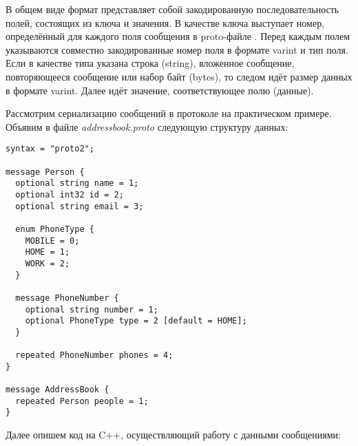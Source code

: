 В общем виде формат представляет собой закодированную последовательность полей, состоящих из ключа и значения. В качестве ключа выступает номер, определённый для каждого поля сообщения в proto-файле \cite{proto_encoding}. Перед каждым полем указываются совместно закодированные номер поля в формате varint и тип поля. Если в качестве типа указана строка (string), вложенное сообщение, повторяющееся сообщение или набор байт (bytes), то следом идёт размер данных в формате varint. Далее идёт значение, соответствующее полю (данные).

Рассмотрим сериализацию сообщений в протоколе на практическом примере. Объявим в файле \textit{addressbook.proto} следующую структуру данных:

\begin{lstlisting}
syntax = "proto2";

message Person {
  optional string name = 1;
  optional int32 id = 2;
  optional string email = 3;

  enum PhoneType {
    MOBILE = 0;
    HOME = 1;
    WORK = 2;
  }

  message PhoneNumber {
    optional string number = 1;
    optional PhoneType type = 2 [default = HOME];
  }

  repeated PhoneNumber phones = 4;
}

message AddressBook {
  repeated Person people = 1;
}
\end{lstlisting}

Далее опишем код на C++, осуществляющий работу с данными сообщениями:

